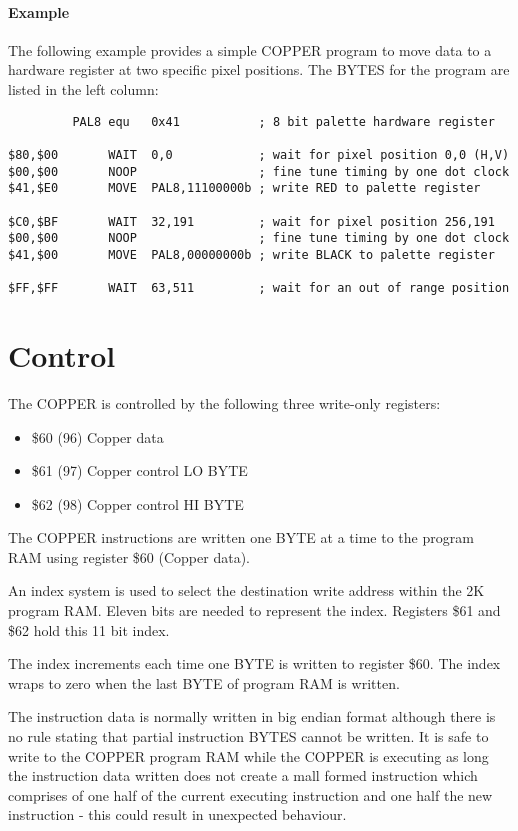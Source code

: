 \paragraph{Example}

The following example provides a simple COPPER program to move data to
a hardware register at two specific pixel positions. The BYTES for the
program are listed in the left column:

\begin{verbatim}
         PAL8 equ   0x41           ; 8 bit palette hardware register

$80,$00       WAIT  0,0            ; wait for pixel position 0,0 (H,V)
$00,$00       NOOP                 ; fine tune timing by one dot clock
$41,$E0       MOVE  PAL8,11100000b ; write RED to palette register

$C0,$BF       WAIT  32,191         ; wait for pixel position 256,191
$00,$00       NOOP                 ; fine tune timing by one dot clock
$41,$00       MOVE  PAL8,00000000b ; write BLACK to palette register

$FF,$FF       WAIT  63,511         ; wait for an out of range position
\end{verbatim}

\section{Control}

The COPPER is controlled by the following three write-only registers:

\begin{itemize}
\item[] \$60 (96)   Copper data
\item[] \$61 (97)   Copper control LO BYTE
\item[] \$62 (98)   Copper control HI BYTE
\end{itemize}

The COPPER instructions are written one BYTE at a time to the program
RAM using register \$60 (Copper data).

An index system is used to select the destination write address within
the 2K program RAM. Eleven bits are needed to represent the
index. Registers \$61 and \$62 hold this 11 bit index.

The index increments each time one BYTE is written to register
\$60. The index wraps to zero when the last BYTE of program RAM is
written.

The instruction data is normally written in big endian format although
there is no rule stating that partial instruction BYTES cannot be
written. It is safe to write to the COPPER program RAM while the
COPPER is executing as long the instruction data written does not
create a mall formed instruction which comprises of one half of the
current executing instruction and one half the new instruction - this
could result in unexpected behaviour.

